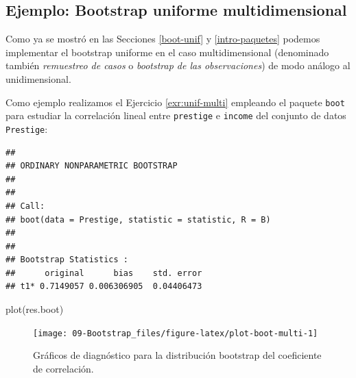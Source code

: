 \documentclass[
]{book}
\newenvironment{Shaded}{\begin{snugshade}}{\end{snugshade}}
\newcommand{\AttributeTok}[1]{\textcolor[rgb]{0.77,0.63,0.00}{#1}}
\newcommand{\ControlFlowTok}[1]{\textcolor[rgb]{0.13,0.29,0.53}{\textbf{#1}}}
\newcommand{\DecValTok}[1]{\textcolor[rgb]{0.00,0.00,0.81}{#1}}
\newcommand{\FunctionTok}[1]{\textcolor[rgb]{0.00,0.00,0.00}{#1}}
\newcommand{\NormalTok}[1]{#1}
\newcommand{\OtherTok}[1]{\textcolor[rgb]{0.56,0.35,0.01}{#1}}
\newcommand{\SpecialCharTok}[1]{\textcolor[rgb]{0.00,0.00,0.00}{#1}}
\theoremstyle{break}
\theoremstyle{nonumberplain}
\begin{document}
\hypertarget{boot-unif-multi}{%
\subsection{Ejemplo: Bootstrap uniforme multidimensional}\label{boot-unif-multi}}

Como ya se mostró en las Secciones \ref{boot-unif} y \ref{intro-paquetes} podemos implementar el bootstrap uniforme en el caso multidimensional (denominado también \emph{remuestreo de casos} o \emph{bootstrap de las observaciones}) de modo análogo al unidimensional.

Como ejemplo realizamos el Ejercicio \ref{exr:unif-multi} empleando el paquete \texttt{boot} para estudiar la correlación lineal entre \texttt{prestige} e \texttt{income} del conjunto de datos \texttt{Prestige}:

\begin{Shaded}
\end{Shaded}

\begin{verbatim}
## 
## ORDINARY NONPARAMETRIC BOOTSTRAP
## 
## 
## Call:
## boot(data = Prestige, statistic = statistic, R = B)
## 
## 
## Bootstrap Statistics :
##      original      bias    std. error
## t1* 0.7149057 0.006306905  0.04406473
\end{verbatim}

\begin{Shaded}
\begin{Highlighting}[]
\FunctionTok{plot}\NormalTok{(res.boot)}
\end{Highlighting}
\end{Shaded}

\begin{figure}[!htb]

{\centering \texttt{[image: 09-Bootstrap\_files/figure-latex/plot-boot-multi-1]} 

}

\caption{Gráficos de diagnóstico para la distribución bootstrap del coeficiente de correlación.}\label{fig:plot-boot-multi}
\end{figure}
\end{document}
